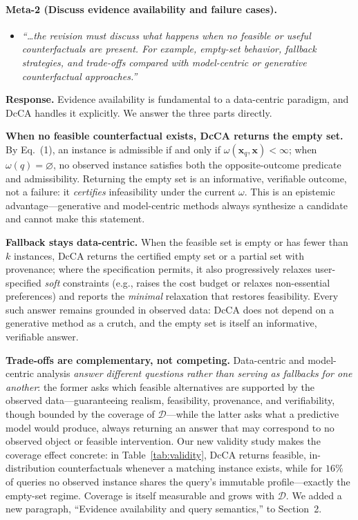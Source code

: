 \paragraph{Meta-2 (Discuss evidence availability and failure cases).}

\begin{itemize}[leftmargin=1.2em, itemsep=1pt, topsep=2pt]
\item \textit{``\dots the revision must discuss what happens when no feasible or useful counterfactuals are present. For example, empty-set behavior, fallback strategies, and trade-offs compared with model-centric or generative counterfactual approaches.''}
\end{itemize}
\smallskip

\noindent\textbf{Response.}
Evidence availability is fundamental to a data-centric paradigm, and DcCA handles it explicitly. We answer the three parts directly.

\textbf{When no feasible counterfactual exists, DcCA returns the empty set.} By Eq.~(1), an instance is admissible if and only if $\omega(\mathbf{x}_q,\mathbf{x})<\infty$; when $\omega(q)=\varnothing$, no observed instance satisfies both the opposite-outcome predicate and admissibility. Returning the empty set is an informative, verifiable outcome, not a failure: it \emph{certifies} infeasibility under the current $\omega$. This is an epistemic advantage---generative and model-centric methods always synthesize a candidate and cannot make this statement.

\textbf{Fallback stays data-centric.} When the feasible set is empty or has fewer than $k$ instances, DcCA returns the certified empty set or a partial set with provenance; where the specification permits, it also progressively relaxes user-specified \emph{soft} constraints (e.g., raises the cost budget or relaxes non-essential preferences) and reports the \emph{minimal} relaxation that restores feasibility. Every such answer remains grounded in observed data: DcCA does not depend on a generative method as a crutch, and the empty set is itself an informative, verifiable answer.

\textbf{Trade-offs are complementary, not competing.} Data-centric and model-centric analysis \emph{answer different questions rather than serving as fallbacks for one another}: the former asks which feasible alternatives are supported by the observed data---guaranteeing realism, feasibility, provenance, and verifiability, though bounded by the coverage of $\mathcal{D}$---while the latter asks what a predictive model would produce, always returning an answer that may correspond to no observed object or feasible intervention. Our new validity study makes the coverage effect concrete: in Table~\ref{tab:validity}, DcCA returns feasible, in-distribution counterfactuals whenever a matching instance exists, while for $16\%$ of queries no observed instance shares the query's immutable profile---exactly the empty-set regime. Coverage is itself measurable and grows with $\mathcal{D}$. We added a new paragraph, ``Evidence availability and query semantics,'' to Section~2.

